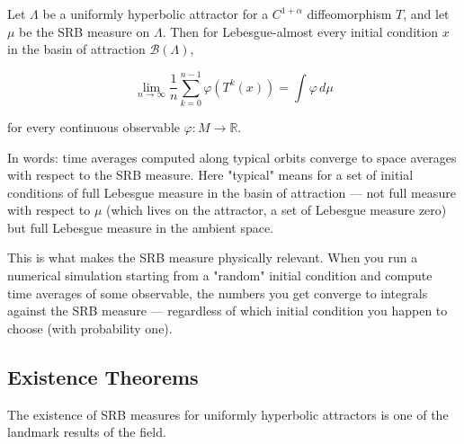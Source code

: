 \begin{theorem}\label{thm:12.8}
Let $\Lambda$ be a uniformly hyperbolic attractor for a $C^{1+\alpha}$ diffeomorphism $T$, and let $\mu$ be the SRB measure on $\Lambda$. Then for Lebesgue-almost every initial condition $x$ in the basin of attraction $\mathcal{B}(\Lambda)$,

\[
\lim_{n \to \infty} \frac{1}{n} \sum_{k=0}^{n-1} \varphi(T^k(x)) = \int \varphi \, d\mu
\]

for every continuous observable $\varphi: M \to \mathbb{R}$.

In words: time averages computed along typical orbits converge to space averages with respect to the SRB measure. Here "typical" means for a set of initial conditions of full Lebesgue measure in the basin of attraction --- not full measure with respect to $\mu$ (which lives on the attractor, a set of Lebesgue measure zero) but full Lebesgue measure in the ambient space.

This is what makes the SRB measure physically relevant. When you run a numerical simulation starting from a "random" initial condition and compute time averages of some observable, the numbers you get converge to integrals against the SRB measure --- regardless of which initial condition you happen to choose (with probability one).
\end{theorem}


\subsection{Existence Theorems}\label{sec:12.2.3}

The existence of SRB measures for uniformly hyperbolic attractors is one of the landmark results of the field.

